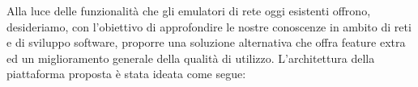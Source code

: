 Alla luce delle funzionalità che gli emulatori di rete oggi esistenti offrono, desideriamo, con l'obiettivo di approfondire le nostre conoscenze in ambito di reti e di sviluppo software, proporre una soluzione alternativa che offra feature extra ed un miglioramento generale della qualità di utilizzo.
\newline\newline
L'architettura della piattaforma proposta è stata ideata come segue:
\begin{center}
\end{center}

